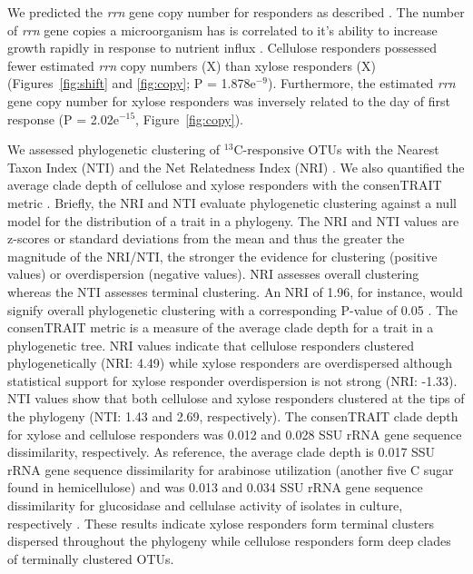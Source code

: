 We predicted the \textit{rrn} gene copy number for responders as described
\citep{Kembel_2012}. The number of \textit{rrn} gene copies
a microorganism has is correlated to it's ability to increase growth
rapidly in response to nutrient influx \citep{Klappenbach_2000}. Cellulose
responders possessed fewer estimated \textit{rrn} copy numbers (X) than xylose
responders (X) (Figures~\ref{fig:shift} and \ref{fig:copy};
P = 1.878e$^{-9}$). Furthermore, the estimated \textit{rrn} gene copy
number for xylose responders was inversely related to the day of first
response (P = 2.02e$^{-15}$, Figure~\ref{fig:copy}).

We assessed phylogenetic clustering of $^{13}$C-responsive OTUs with the
Nearest Taxon Index (NTI) and the Net Relatedness Index (NRI)
\citep{Webb2000}. We also quantified the average clade depth of cellulose and
xylose responders with the consenTRAIT metric \citep{Martiny2013}. Briefly, the
NRI and NTI evaluate phylogenetic clustering against a null model for the
distribution of a trait in a phylogeny. The NRI and NTI values are z-scores or
standard deviations from the mean and thus the greater the magnitude of the
NRI/NTI, the stronger the evidence for clustering (positive values) or
overdispersion (negative values). NRI assesses overall clustering whereas the
NTI assesses terminal clustering. An NRI of 1.96, for instance, would signify
overall phylogenetic clustering with a corresponding P-value of 0.05
\citep{Evans2014a}. The consenTRAIT metric is a measure of the average clade
depth for a trait in a phylogenetic tree. NRI values indicate that cellulose
responders clustered phylogenetically (NRI: 4.49) while xylose responders are
overdispersed although statistical support for xylose responder
overdispersion is not strong (NRI: -1.33). NTI values show that both cellulose
and xylose responders clustered at the tips of the phylogeny (NTI: 1.43 and
2.69, respectively). The consenTRAIT clade depth for xylose and cellulose
responders was 0.012 and 0.028 SSU rRNA gene sequence dissimilarity,
respectively. As reference, the average clade depth is 0.017 SSU rRNA gene
sequence dissimilarity for arabinose utilization (another five C sugar found in
hemicellulose) and was 0.013 and 0.034 SSU rRNA gene sequence dissimilarity for
glucosidase and cellulase activity of isolates in culture, respectively
\citep{Martiny2013,Berlemont2013}. These results indicate xylose responders
form terminal clusters dispersed throughout the phylogeny while cellulose
responders form deep clades of terminally clustered OTUs.
